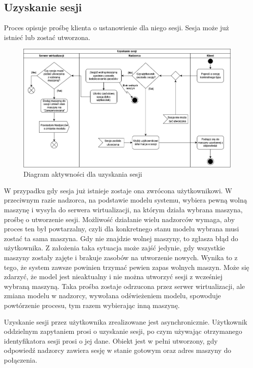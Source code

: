 \documentclass[../opis-rozwiazania.tex]{subfiles}
\begin{document}
\label{diagrams:activity_diagrams}

\subsection{Uzyskanie sesji}

Proces opisuje prośbę klienta o ustanowienie dla niego sesji. Sesja może już istnieć lub zostać utworzona.

\begin{figure}[H]
  \centering
  \includegraphics[width=\textwidth]{../diagrams/activity_diagrams/uzyskanie_sesji_v2.png}
  \caption{Diagram aktywności dla uzyskania sesji}
  \label{start_session}
\end{figure}

W przypadku gdy sesja już istnieje zostaje ona zwrócona użytkownikowi.
W przeciwnym razie nadzorca, na podstawie modelu systemu, wybiera pewną wolną maszynę i wysyła do serwera wirtualizacji, na którym działa wybrana maszyna, prośbę o utworzenie sesji. Możliwość działanie wielu nadzorców wymaga, aby proces ten był powtarzalny, czyli dla konkretnego stanu modelu wybrana musi zostać ta sama maszyna.
Gdy nie znajdzie wolnej maszyny, to zgłasza błąd do użytkownika.
Z założenia taka sytuacja może zajść jedynie, gdy wszystkie maszyny zostały zajęte i brakuje zasobów na utworzenie nowych. Wynika to z tego, że system zawsze powinien trzymać pewien zapas wolnych maszyn.
Może się zdarzyć, że model jest nieaktualny i nie można utworzyć sesji z wcześniej wybraną maszyną.
Taka prośba zostaje odrzucona przez serwer wirtualizacji, ale zmiana modelu w nadzorcy, wywołana odświeżeniem modelu, spowoduje powtórzenie procesu, tym razem wybierając inną maszynę.

Uzyskanie sesji przez użytkownika zrealizowane jest asynchronicznie.
Użytkownik oddzielnym zapytaniem prosi o uzyskanie sesji, po czym używając otrzymanego identyfikatora sesji prosi o jej dane.
Obiekt jest w pełni utworzony, gdy odpowiedź nadzorcy zawiera sesję w stanie gotowym oraz adres maszyny do połączenia.
\end{document}
